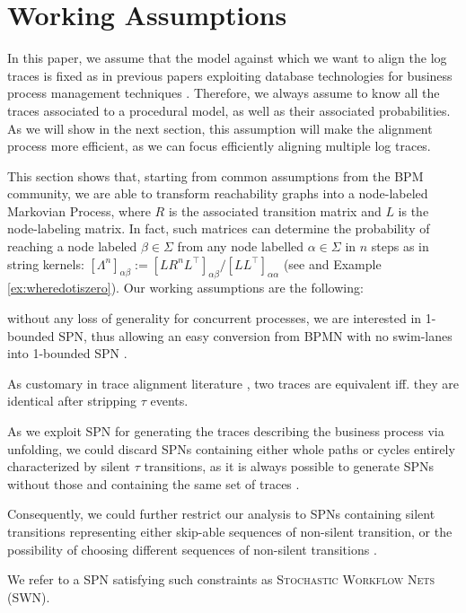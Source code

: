 \section{Working Assumptions}\label{sec:was}
In this paper, we assume that the model against which we want to align the log traces is fixed as in previous papers exploiting database technologies for business process management techniques \cite{SchonigRCJM16}. Therefore, we always assume to know all the traces associated to a procedural model, as well as their associated probabilities. As we will show in the next section, this assumption will make the alignment process more efficient, as we can focus efficiently aligning multiple log traces. 

This section shows that, starting from common assumptions from the BPM community, we are able to transform reachability graphs into a node-labeled Markovian Process, where  $R$ is the associated transition matrix and $L$ is the node-labeling matrix. In fact, such matrices can determine the probability of reaching a node labeled $\beta\in\Sigma$ from any node labelled $\alpha\in\Sigma$ in $n$ steps as in string kernels:   $[\Lambda^n]_{\alpha\beta}:=[LR^nL^\top]_{\alpha\beta}/[LL^\top]_{\alpha\alpha}$ (see \cite{GartnerFW03} and Example \ref{ex:wheredotiszero}). 
%
Our working assumptions are the following: \begin{mylist}
\item without any loss of generality for concurrent processes, we are interested in 1-bounded SPN, thus allowing an easy conversion from BPMN with no swim-lanes into 1-bounded SPN \cite{RaedtsPUWGS07}.
\item As customary in trace alignment literature \cite{DBLP:conf/edoc/AdriansyahDA11,LeoniM17}, two traces are equivalent iff. they are identical after stripping $\tau$ events.
\item As we exploit SPN for generating the traces describing the business process via unfolding, we could discard SPNs containing either whole paths or cycles entirely characterized by silent $\tau$ transitions, as it is always possible to generate SPNs without those and containing the same set of traces \cite{Bergami21}.
\item Consequently, we could further restrict our analysis to SPNs containing silent transitions representing either skip-able sequences of non-silent transition, or the possibility of choosing different sequences of non-silent transitions \cite{Bergami21}.
\end{mylist} We refer to a SPN satisfying such constraints as \textsc{Stochastic Workflow Nets} (SWN). 

